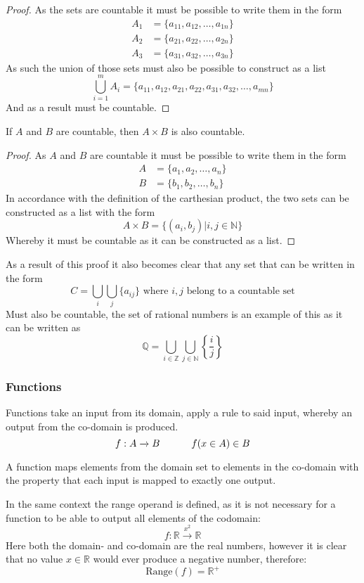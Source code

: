 \begin{proof}
  As the sets are countable it must be possible to write them in the form
  \begin{align*}
      A_1&=\{a_{11},a_{12},\ldots,a_{1n}\} \\
      A_2&=\{a_{21},a_{22},\ldots,a_{2n}\} \\
      A_3&=\{a_{31},a_{32},\ldots,a_{3n}\}
  \end{align*}
  As such the union of those sets must also be possible to construct as a list
  \[
      \bigcup_{i=1}^{m}A_{i}=\{a_{11},a_{12},a_{21},a_{22},a_{31},a_{32},\ldots,a_{mn}\}
  \]
  And as a result must be countable.
\end{proof}
\begin{theorem}
  If $A$ and $B$ are countable, then $A\times B$ is also countable.
\end{theorem}
\begin{proof}
  As $A$ and $B$ are countable it must be possible to write them in the form
  \begin{align*}
      A&=\{a_{1},a_{2},\ldots,a_{n}\} \\
      B&=\{b_{1},b_{2},\ldots,b_{n}\}
  \end{align*}
  In accordance with the definition of the carthesian product, the two sets can be constructed as a list with the form
  \[
      A\times B=\{(a_{i},b_{j})|i,j\in \mathbb{N}\}
  \]
  Whereby it must be countable as it can be constructed as a list.
\end{proof}
As a result of this proof it also becomes clear that any set that can be written in the form
\[
    C=\bigcup_{i}\bigcup_{j}\{a_{ij}\}\text{ where }i,j \text{ belong to a countable set}
\]
Must also be countable, the set of rational numbers is an example of this as it can be written as
\[
    \mathbb{Q}=\bigcup_{i\in \mathbb{Z}}\bigcup_{j\in \mathbb{N}}\left\{\frac{i}{j}\right\}
\]
\subsubsection{Functions}
Functions take an input from its domain, apply a rule to said input, whereby an output from the co-domain is produced.
\[
    f:A\xrightarrow{} B\hskip 32pt f(x\in A)\in B
\]
\begin{definition}[Function]
  A function maps elements from the domain set to elements in the co-domain with the property that each input is mapped to exactly one output.
\end{definition}
In the same context the range operand is defined, as it is not necessary for a function to be able to output all elements of the codomain:
\[
    f: \mathbb{R} \xrightarrow{x^{2}} \mathbb{R}
\]
Here both the domain- and co-domain are the real numbers, however it is clear that no value $x\in \mathbb{R}$ would ever produce a negative number, therefore:
\[
    \text{Range}(f)=\mathbb{R}^{+}
\]
